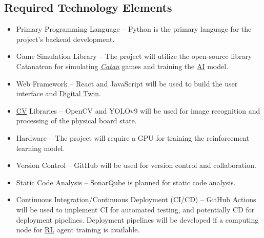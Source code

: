 \documentclass{article}
\newcommand{\Catan}{\href{https://en.wikipedia.org/wiki/Catan}{Catan}}
\newcommand{\AI}{\href{https://en.wikipedia.org/wiki/Artificial_intelligence}{AI}}
\newcommand{\RL}{\href{https://www.ibm.com/think/topics/reinforcement-learning}{RL}}
\newcommand{\DigitalTwin}{\href{https://en.wikipedia.org/wiki/Digital_twin}{Digital Twin}}
\newcommand{\CV}{\href{https://www.ibm.com/think/topics/computer-vision}{CV}}
\begin{document}
\subsection{Required Technology Elements}\label{subsec:requiredtech}
\begin{itemize}
    \item {Primary Programming Language} – Python is the primary language for the project's backend development.
    \item {Game Simulation Library} – The project will utilize the open-source library Catanatron for simulating \emph{\Catan{}} games and training the \AI{} model.
    \item {Web Framework} – React and JavaScript will be used to build the user interface and \DigitalTwin{}.
    \item {\CV{} Libraries} – OpenCV and YOLOv9 will be used for image recognition and processing of the physical board state.
    \item {Hardware} – The project will require a GPU for training the reinforcement learning model.
    \item {Version Control} – GitHub will be used for version control and collaboration.
    \item {Static Code Analysis} – SonarQube is planned for static code analysis.
    \item {Continuous Integration/Continuous Deployment (CI/CD)} – GitHub Actions will be used to implement CI for automated testing, and potentially CD for deployment pipelines. Deployment pipelines will be developed if a computing node for \RL{} agent training is available.
\end{itemize}
\end{document}

